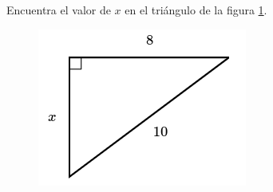 Encuentra el valor de $x$ en el triángulo de la figura \ref{fig:lados_pitagoras_25}.

\begin{minipage}[t][][t]{0.35\textwidth}
    \begin{figure}[H]
        \centering
        \includegraphics[width=0.9\linewidth]{../images/lados_pitagoras_25.png}

        \caption{}
        \label{fig:lados_pitagoras_25}
    \end{figure}
\end{minipage}\hfill
